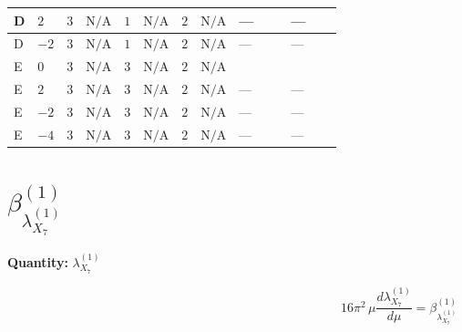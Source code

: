 \documentclass[8pt]{article}
\begin{document}
\begin{landscape}
\begin{longtable}{@{}llcccccc >{\raggedright\arraybackslash}p{0.21\linewidth} >{\raggedright\arraybackslash}p{0.21\linewidth}@{}}
\midrule
D & $2$ & $3$ & $\text{N/A}$ & $1$ & $\text{N/A}$ & $2$ & $\text{N/A}$ & --- & --- \\
\midrule
D & $-2$ & $3$ & $\text{N/A}$ & $1$ & $\text{N/A}$ & $2$ & $\text{N/A}$ & --- & --- \\
\midrule
E & $0$ & $3$ & $\text{N/A}$ & $3$ & $\text{N/A}$ & $2$ & $\text{N/A}$ & \scriptsize\adjustbox{max width=\linewidth}{$\begin{gathered} +{\lambda_{X_{5}}^{(2)}}^2\end{gathered}$} & \scriptsize\adjustbox{max width=\linewidth}{$\begin{gathered} +2 {\lambda_{X_{5}}^{(1)}} {\lambda_{X_{5}}^{(2)}}\end{gathered}$} \\
\midrule
E & $2$ & $3$ & $\text{N/A}$ & $3$ & $\text{N/A}$ & $2$ & $\text{N/A}$ & --- & --- \\
\midrule
E & $-2$ & $3$ & $\text{N/A}$ & $3$ & $\text{N/A}$ & $2$ & $\text{N/A}$ & --- & --- \\
\midrule
E & $-4$ & $3$ & $\text{N/A}$ & $3$ & $\text{N/A}$ & $2$ & $\text{N/A}$ & --- & --- \\
\midrule
\bottomrule
\end{longtable}
\clearpage
\section*{$\beta_{{\lambda_{X_{7}}^{(1)}}}^{(1)}$}
\noindent\textbf{Quantity: }${\lambda_{X_{7}}^{(1)}}$\par\smallskip
\[16\pi^2\,\mu\frac{d {\lambda_{X_{7}}^{(1)}}}{d\mu}=\beta_{{\lambda_{X_{7}}^{(1)}}}^{(1)}\]

\end{landscape}
\end{document}
